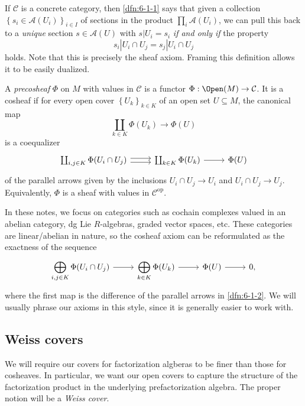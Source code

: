 If $\mathcal{C} $ is a concrete category, then \cref{dfn:6-1-1} says that given a collection $\left\{ s_i\in \mathcal{A} (U_i) \right\} _{i\in I} $ of sections in the product $\prod_{i} \mathcal{A} (U_i)$, we can pull this back to a \emph{unique} section $s\in \mathcal{A} (U)$ with $s|U_i = s_i$ \emph{if and only if} the property
\[
	s_i|U_i \cap U_j = s_j|U_i \cap U_j
\]
holds. Note that this is precisely the sheaf axiom. Framing this definition allows it to be easily dualized.
\begin{definition}\label{dfn:6-1-2}
	A \emph{precosheaf} $\Phi $ on $M$ with values in $\mathcal{C} $ is a functor $\Phi : \Open(M)  \to \mathcal{C} $. It is a cosheaf if for every open cover $\left\{ U_k \right\} _{k\in K} $ of an open set $U\subseteq M$, the canonical map
	\[
		\coprod_{k\in K} \Phi (U_k) \to \Phi (U)
	\]
	is a coequalizer
	\[\begin{tikzcd}[row sep = 2.5em, column sep = 2.5em]
		\coprod_{i,j\in K} \Phi (U_i \cap U_j) \ar[shift left, r] \ar[shift right, r]  & \coprod_{k\in K} \Phi (U_k)\ar[r]  & \Phi (U)
	\end{tikzcd}\]
	of the parallel arrows given by the inclusions $U_i \cap U_j \to U_i$ and $U_i \cap U_j \to U_j$. Equivalently, $\Phi $ is a sheaf with values in $\mathcal{C} ^{\mathrm{op}} $.
\end{definition}

\begin{remark}\label{rmk:6-1-3}
In these notes, we focus on categories such as cochain complexes valued in an abelian category, dg Lie $R$-algebras, graded vector spaces, etc. These categories are linear/abelian in nature, so the cosheaf axiom can be reformulated as the exactness of the sequence
\[\begin{tikzcd}[row sep = 2.5em, column sep = 2.5em]
	\displaystyle{\bigoplus_{i,j\in K} \Phi (U_i \cap U_j)}\ar[r]   & \displaystyle{\bigoplus_{k\in K} \Phi (U_k)}\ar[r]  & \Phi (U)\ar[r]  & 0,
\end{tikzcd}\]
where the first map is the difference of the parallel arrows in \cref{dfn:6-1-2}. We will usually phrase our axioms in this style, since it is generally easier to work with.
\end{remark}

\subsection{Weiss covers}

We will require our covers for factorization algberas to be finer than those for cosheaves. In particular, we want our open covers to capture the structure of the factorization product in the underlying prefactorization algebra. The proper notion will be a \emph{Weiss cover}.

